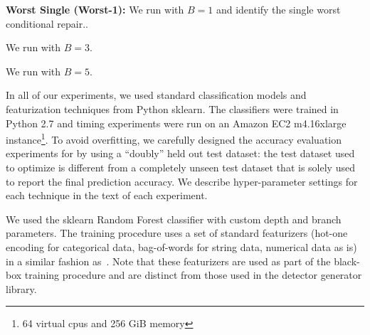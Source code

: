 \vspace{0.25em}\noindent\textbf{Worst Single (Worst-1): } We run \sys with $B=1$ and identify the single worst conditional repair..

 We run \sys with $B=3$.

 We run \sys with $B=5$.


\vspace{0.25em}



In all of our experiments, we used standard classification models and featurization techniques from Python \textsf{sklearn}.
The classifiers were trained in Python 2.7 and timing experiments were run on an Amazon EC2 m4.16xlarge instance\footnote{64 virtual cpus and 256 GiB memory}.
To avoid overfitting, we carefully designed the accuracy evaluation experiments for \sys by using a ``doubly'' held out test dataset: the test dataset used to optimize \sys is different from a completely unseen test dataset that is solely used to report the final prediction accuracy.
We describe hyper-parameter settings for each technique in the text of each experiment.

We used the \textsf{sklearn} Random Forest classifier with custom depth and branch parameters.  The training procedure uses a set of standard featurizers (hot-one encoding for categorical data, bag-of-words for string data, numerical data as is) in a similar fashion as~\cite{DBLP:conf/sigmod/GokhaleDDNRSZ14}.  Note that these featurizers are used as part of the black-box training procedure and are distinct from those used in the detector generator library.




